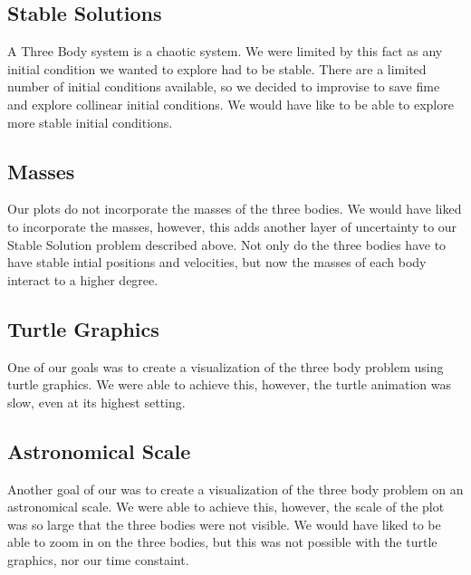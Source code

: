\documentclass{article}
\begin{document}
\subsection{Stable Solutions}
A Three Body system is a chaotic system. We were limited by this fact as any initial condition we wanted to explore had to be stable. There are a limited number of initial conditions available, so we decided to improvise to save fime and explore collinear initial conditions. We would have like to be able to explore more stable initial conditions.

\subsection{Masses}
Our plots do not incorporate the masses of the three bodies. We would have liked to incorporate the masses, however, this adds another layer of uncertainty to our Stable Solution problem described above. Not only do the three bodies have to have stable intial positions and velocities, but now the masses of each body interact to a higher degree.

\subsection{Turtle Graphics}
One of our goals was to create a visualization of the three body problem using turtle graphics. We were able to achieve this, however, the turtle animation was slow, even at its highest setting.

\subsection{Astronomical Scale}
Another goal of our was to create a visualization of the three body problem on an astronomical scale. We were able to achieve this, however, the scale of the plot was so large that the three bodies were not visible. We would have liked to be able to zoom in on the three bodies, but this was not possible with the turtle graphics, nor our time constaint.
\end{document}
